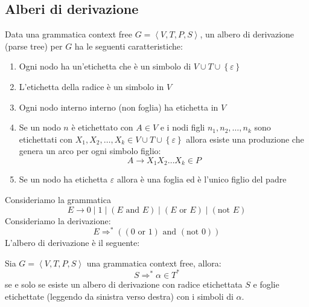 \documentclass[a4paper]{article}
\begin{document}
\subsection{Alberi di derivazione}
Data una grammatica context free \( G = \left< V, T, P, S \right> \), un albero di
derivazione (parse tree) per \( G \) ha le seguenti caratteristiche:
\begin{enumerate}
  \item Ogni nodo ha un'etichetta che è un simbolo di \( V \cup T \cup \left\{ \varepsilon \right\} \)
  \item L'etichetta della radice è un simbolo in \( V \) 
  \item Ogni nodo interno interno (non foglia) ha etichetta in \( V \)
  \item Se un nodo \( n \) è etichettato con \( A \in V \) e i nodi figli
    \( n_1, n_2, \ldots, n_k \) sono etichettati con \( X_1, X_2, \ldots, X_k \in V \cup T \cup
    \left\{ \varepsilon \right\} \) allora esiste una produzione che genera un arco per
    ogni simbolo figlio:
    \[
      A \to X_1 X_2 \ldots X_k \in P
    \]
    \label{03-11-D1}

  \item Se un nodo ha etichetta \( \varepsilon \) allora è una foglia ed è l'unico figlio
    del padre
    \label{03-11-D2}
\end{enumerate}

\begin{example}
  Consideriamo la grammatica
  \[
    E \to 0 \;|\; 1 \;|\; (E \text{ and } E) \;|\; (E \text{ or } E) \;|\; (\text{not } E)
  \]
  Consideriamo la derivazione:
  \[
    E \Rightarrow^* \left( \left( 0 \text{ or } 1 \right)  \text{ and } \left( \text{not } 0 \right)  \right) 
  \] 
  L'albero di derivazione è il seguente:
  \label{03-11-D3}
\end{example}

\begin{theorem}
  Sia \( G = \left< V, T, P, S \right> \) una grammatica context free, allora:
  \[
    S \Rightarrow^* \alpha \in T^*
  \] 
  se e solo se esiste un albero di derivazione con radice etichettata \( S \) e
  foglie etichettate (leggendo da sinistra verso destra) con i simboli di \( \alpha \).
\end{theorem}
\end{document}
